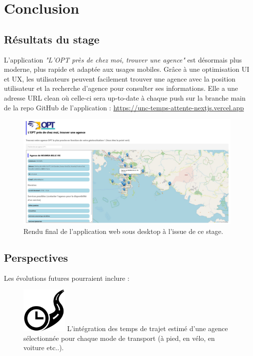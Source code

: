 \documentclass[12pt,a4paper]{report}
\begin{document}
\chapter{Conclusion}
\section{Résultats du stage}
L’application \textit{"L'OPT près de chez moi, trouver une agence"} est désormais plus moderne, plus rapide et adaptée aux usages mobiles. Grâce à une optimisation UI et UX, les utilisateurs peuvent facilement trouver une agence avec la position utilisateur et la recherche d'agence pour consulter ses informations. Elle a une adresse URL clean où celle-ci sera up-to-date à chaque push sur la branche main de la repo GitHub de l'application : \href{https://unc-temps-attente-nextjs.vercel.app}{https://unc-temps-attente-nextjs.vercel.app}
\begin{figure}[h] %
    \centering
    \includegraphics[width=1\textwidth]{ressources_rapport/app_opt.JPG}
    \caption{Rendu final de l'application web sous desktop à l'issue de ce stage.}
\end{figure}
\newpage

\section{Perspectives}
Les évolutions futures pourraient inclure :

\vspace{1cm}
\begin{figure}[h] %
    \centering
    \includegraphics[width=0.2\textwidth]{ressources_rapport/temps_trajet.png}
    L’intégration des temps de trajet estimé d'une agence sélectionnée pour chaque mode de transport (à pied, en vélo, en voiture etc..).
\end{figure}
\end{document}
